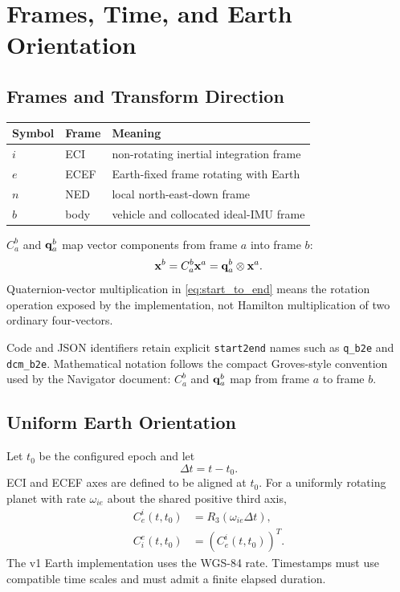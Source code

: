 \chapter{Frames, Time, and Earth Orientation}

\section{Frames and Transform Direction}

\begin{center}
\begin{tabular}{lll}
\toprule
Symbol & Frame & Meaning \\
\midrule
$i$ & ECI & non-rotating inertial integration frame \\
$e$ & ECEF & Earth-fixed frame rotating with Earth \\
$n$ & NED & local north-east-down frame \\
$b$ & body & vehicle and collocated ideal-IMU frame \\
\bottomrule
\end{tabular}
\end{center}

$C_a^b$ and $\mathbf{q}_a^b$ map vector components from frame $a$ into frame
$b$:
\begin{equation}
\mathbf{x}^{b}=C_a^b\mathbf{x}^{a}
              =\mathbf{q}_a^b\otimes\mathbf{x}^{a}.
\label{eq:start_to_end}
\end{equation}
Quaternion-vector multiplication in \cref{eq:start_to_end} means the rotation
operation exposed by the implementation, not Hamilton multiplication of two
ordinary four-vectors.

\begin{warningbox}
Code and JSON identifiers retain explicit \texttt{start2end} names such as
\texttt{q\_b2e} and \texttt{dcm\_b2e}. Mathematical notation follows the
compact Groves-style convention used by the Navigator document:
$C_a^b$ and $\mathbf{q}_a^b$ map from frame $a$ to frame $b$.
\end{warningbox}

\section{Uniform Earth Orientation}

Let $t_0$ be the configured epoch and let
\begin{equation}
\Delta t=t-t_0.
\end{equation}
ECI and ECEF axes are defined to be aligned at $t_0$. For a uniformly rotating
planet with rate $\omega_{ie}$ about the shared positive third axis,
\begin{align}
C_e^i(t,t_0) &= R_3\!\left(\omega_{ie}\Delta t\right),\\
C_i^e(t,t_0) &= \left(C_e^i(t,t_0)\right)^{T}.
\label{eq:earth_orientation}
\end{align}
The v1 Earth implementation uses the WGS-84 rate. Timestamps must use
compatible time scales and must admit a finite elapsed duration.

